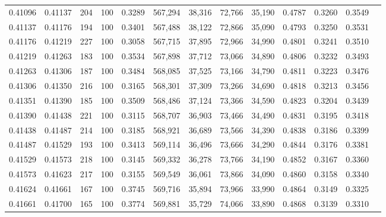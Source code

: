 \begin{tabular}{rrrrrrrrrrrrr}
0.41096 & 0.41137 &   204 & 100 &                                     0.3289 & 567,294 &  38,316 &  72,766 &  35,190 & 0.4787 & 0.3260 & 0.3549 \\
0.41137 & 0.41176 &   194 & 100 &                                     0.3401 & 567,488 &  38,122 &  72,866 &  35,090 & 0.4793 & 0.3250 & 0.3531 \\
0.41176 & 0.41219 &   227 & 100 &                                     0.3058 & 567,715 &  37,895 &  72,966 &  34,990 & 0.4801 & 0.3241 & 0.3510 \\
0.41219 & 0.41263 &   183 & 100 &                                     0.3534 & 567,898 &  37,712 &  73,066 &  34,890 & 0.4806 & 0.3232 & 0.3493 \\
0.41263 & 0.41306 &   187 & 100 &                                     0.3484 & 568,085 &  37,525 &  73,166 &  34,790 & 0.4811 & 0.3223 & 0.3476 \\
0.41306 & 0.41350 &   216 & 100 &                                     0.3165 & 568,301 &  37,309 &  73,266 &  34,690 & 0.4818 & 0.3213 & 0.3456 \\
0.41351 & 0.41390 &   185 & 100 &                                     0.3509 & 568,486 &  37,124 &  73,366 &  34,590 & 0.4823 & 0.3204 & 0.3439 \\
0.41390 & 0.41438 &   221 & 100 &                                     0.3115 & 568,707 &  36,903 &  73,466 &  34,490 & 0.4831 & 0.3195 & 0.3418 \\
0.41438 & 0.41487 &   214 & 100 &                                     0.3185 & 568,921 &  36,689 &  73,566 &  34,390 & 0.4838 & 0.3186 & 0.3399 \\
0.41487 & 0.41529 &   193 & 100 &                                     0.3413 & 569,114 &  36,496 &  73,666 &  34,290 & 0.4844 & 0.3176 & 0.3381 \\
0.41529 & 0.41573 &   218 & 100 &                                     0.3145 & 569,332 &  36,278 &  73,766 &  34,190 & 0.4852 & 0.3167 & 0.3360 \\
0.41573 & 0.41623 &   217 & 100 &                                     0.3155 & 569,549 &  36,061 &  73,866 &  34,090 & 0.4860 & 0.3158 & 0.3340 \\
0.41624 & 0.41661 &   167 & 100 &                                     0.3745 & 569,716 &  35,894 &  73,966 &  33,990 & 0.4864 & 0.3149 & 0.3325 \\
0.41661 & 0.41700 &   165 & 100 &                                     0.3774 & 569,881 &  35,729 &  74,066 &  33,890 & 0.4868 & 0.3139 & 0.3310 \\

\end{tabular}
